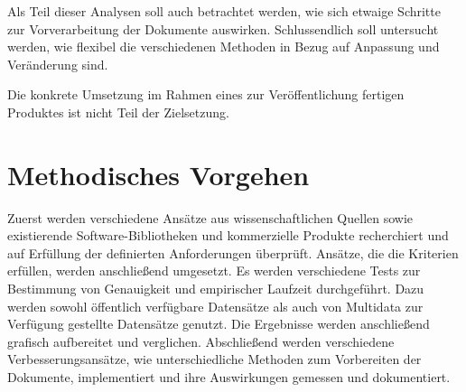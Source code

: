 Als Teil dieser Analysen soll auch betrachtet werden, wie sich etwaige Schritte zur Vorverarbeitung der Dokumente auswirken. Schlussendlich soll untersucht werden, wie flexibel die verschiedenen Methoden in Bezug auf Anpassung und Veränderung sind.

Die konkrete Umsetzung im Rahmen eines zur Veröffentlichung fertigen Produktes ist nicht Teil der Zielsetzung.

\section{Methodisches Vorgehen}
\label{sec:methodisches-vorgehen}

Zuerst werden verschiedene Ansätze aus wissenschaftlichen Quellen sowie existierende Software-Bibliotheken und kommerzielle Produkte recherchiert und auf Erfüllung der definierten Anforderungen überprüft. Ansätze, die die Kriterien erfüllen, werden anschließend umgesetzt. Es werden verschiedene Tests zur Bestimmung von Genauigkeit und empirischer Laufzeit durchgeführt. Dazu werden sowohl öffentlich verfügbare Datensätze als auch von Multidata zur Verfügung gestellte Datensätze genutzt. Die Ergebnisse werden anschließend grafisch aufbereitet und verglichen. Abschließend werden verschiedene Verbesserungsansätze, wie unterschiedliche Methoden zum Vorbereiten der Dokumente, implementiert und ihre Auswirkungen gemessen und dokumentiert.